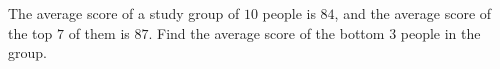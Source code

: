The average score of a study group of $10$ people is $84$, and the average score of the top $7$ of them is $87$. Find the average score of the bottom $3$ people in the group.
